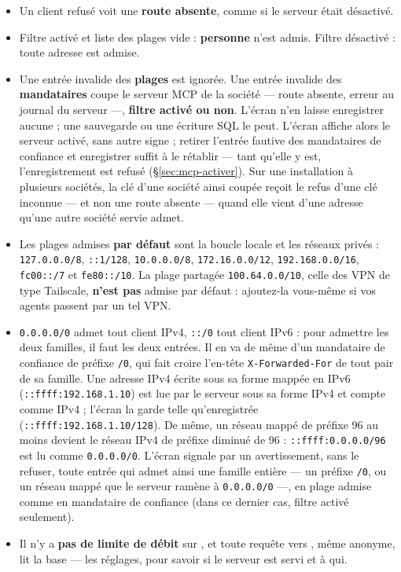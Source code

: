 \documentclass[a4paper,11pt,oneside]{article}
\begin{document}
\begin{itemize}
    \item Un client refusé voit une \textbf{route absente}, comme si le serveur était désactivé.
    \item Filtre activé et liste des plages vide : \textbf{personne} n'est admis. Filtre désactivé : toute adresse est admise.
    \item Une entrée invalide des \textbf{plages} est ignorée. Une entrée invalide des \textbf{mandataires} coupe le serveur MCP de la société --- route absente, erreur au journal du serveur ---, \textbf{filtre activé ou non}. L'écran n'en laisse enregistrer aucune ; une sauvegarde ou une écriture SQL le peut. L'écran affiche alors le serveur activé, sans autre signe ; retirer l'entrée fautive des mandataires de confiance et enregistrer suffit à le rétablir --- tant qu'elle y est, l'enregistrement est refusé (\S\ref{sec:mcp-activer}). Sur une installation à plusieurs sociétés, la clé d'une société ainsi coupée reçoit le refus d'une clé inconnue --- et non une route absente --- quand elle vient d'une adresse qu'une autre société servie admet.
    \item Les plages admises \textbf{par défaut} sont la boucle locale et les réseaux privés :
\texttt{127.0.0.0/8}, \texttt{::1/128}, \texttt{10.0.0.0/8}, \texttt{172.16.0.0/12}, \texttt{192.168.0.0/16}, \texttt{fc00::/7} et \texttt{fe80::/10}.
    La plage partagée \texttt{100.64.0.0/10}, celle des VPN de type Tailscale, \textbf{n'est pas} admise par défaut : ajoutez-la vous-même si vos agents passent par un tel VPN.
    \item \texttt{0.0.0.0/0} admet tout client IPv4, \texttt{::/0} tout client IPv6 : pour admettre les deux familles, il faut les deux entrées. Il en va de même d'un mandataire de confiance de préfixe \texttt{/0}, qui fait croire l'en-tête \texttt{X-Forwarded-For} de tout pair de sa famille. Une adresse IPv4 écrite sous sa forme mappée en IPv6 (\texttt{::ffff:192.168.1.10}) est lue par le serveur sous sa forme IPv4 et compte comme IPv4 ; l'écran la garde telle qu'enregistrée (\texttt{::ffff:192.168.1.10/128}). De même, un réseau mappé de préfixe 96 au moins devient le réseau IPv4 de préfixe diminué de 96 : \texttt{::ffff:0.0.0.0/96} est lu comme \texttt{0.0.0.0/0}. L'écran signale par un avertissement, sans le refuser, toute entrée qui admet ainsi une famille entière --- un préfixe \texttt{/0}, ou un réseau mappé que le serveur ramène à \texttt{0.0.0.0/0} ---, en plage admise comme en mandataire de confiance (dans ce dernier cas, filtre activé seulement).
    \item Il n'y a \textbf{pas de limite de débit} sur , et toute requête vers , même anonyme, lit la base --- les réglages, pour savoir si le serveur est servi et à qui.
\end{itemize}
\end{document}
